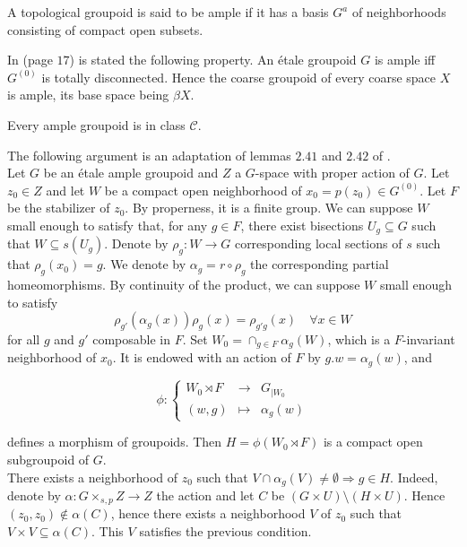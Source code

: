 \begin{definition}
A topological groupoid is said to be ample if it has a basis $G^a$ of neighborhoods consisting of compact open subsets.
\end{definition}

In \cite{paterson} (page $17$) is stated the following property. An étale groupoid $G$ is ample iff $G^{(0)}$ is totally disconnected. Hence the coarse groupoid of every coarse space $X$ is ample, its base space being $\beta X$.

\begin{prop}\label{ampleC}
Every ample groupoid is in class $\mathcal C$.
\end{prop}

\begin{dem} The following argument is an adaptation of lemmas $2.41$ and $2.42$ of \cite{TuNonHaus}.\\%

Let $G$ be an étale ample groupoid and $Z$ a $G$-space with proper action of $G$. Let $z_0\in Z$ and let $W$ be a compact open neighborhood of $x_0=p(z_0)\in G^{(0)}$. Let $F$ be the stabilizer of $z_0$. By properness, it is a finite group. We can suppose $W$ small enough to satisfy that, for any $g\in F$, there exist bisections $U_g \subseteq G$ such that $W \subseteq s(U_g)$. Denote by $\rho_g : W\rightarrow G$ corresponding local sections of $s$ such that $\rho_g(x_0)=g$. We denote by $\alpha_g =r\circ \rho_g$ the corresponding partial homeomorphisms. By continuity of the product, we can suppose $W$ small enough to satisfy 
\[\rho_{g'}(\alpha_g(x))\rho_g(x) = \rho_{g'g}(x) \quad\forall x\in W\]
for all $g$ and $g'$ composable in $F$. Set $W_0 = \cap_{g\in F}\alpha_g(W)$, which is a $F$-invariant neighborhood of $x_0$. It is endowed with an action of $F$ by $g.w=\alpha_g(w)$, and 

\[\phi : \left\{ \begin{array}{rcl}
W_0\rtimes F & \rightarrow & G_{|W_0} \\ 
(w,g) & \mapsto & \alpha_g(w) \end{array}\right.\] 

defines a morphism of groupoids. Then $H= \phi(W_0\rtimes F)$ is a compact open subgroupoid of $G$.\\

There exists a neighborhood of $z_0$ such that $V\cap \alpha_g(V) \neq \emptyset \Rightarrow g\in H$. Indeed, denote by $\alpha : G\times_{s,p} Z\rightarrow Z$ the action and let $C$ be  $(G\times U) \setminus (H\times U)$. Hence $(z_0,z_0)\notin \alpha(C)$, hence there exists a neighborhood $V$ of $z_0$ such that $V\times V \subseteq \alpha(C)$. This $V$ satisfies the previous condition. \\


\end{dem}
